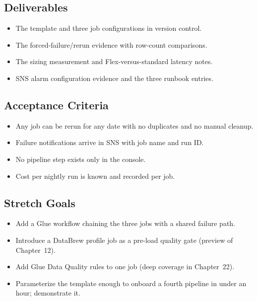 \subsection*{Deliverables}
\begin{itemize}
    \item The template and three job configurations in version control.
    \item The forced-failure/rerun evidence with row-count comparisons.
    \item The sizing measurement and Flex-versus-standard latency notes.
    \item SNS alarm configuration evidence and the three runbook entries.
\end{itemize}

\subsection*{Acceptance Criteria}
\begin{itemize}
    \item Any job can be rerun for any date with no duplicates and no manual cleanup.
    \item Failure notifications arrive in SNS with job name and run ID.
    \item No pipeline step exists only in the console.
    \item Cost per nightly run is known and recorded per job.
\end{itemize}

\subsection*{Stretch Goals}
\begin{itemize}
    \item Add a Glue workflow chaining the three jobs with a shared failure path.
    \item Introduce a DataBrew profile job as a pre-load quality gate (preview of Chapter~12).
    \item Add Glue Data Quality rules to one job (deep coverage in Chapter~22).
    \item Parameterize the template enough to onboard a fourth pipeline in under an hour; demonstrate it.
\end{itemize}
